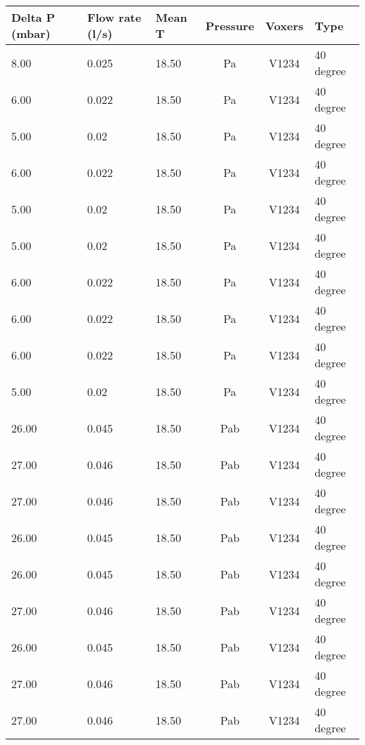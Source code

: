 \begin{table}[t]
\centering
\begin{tabular}{l | l | l | c | c | l}
Delta P (mbar) & Flow rate (l/s) & Mean T & Pressure & Voxers & Type                \\ \hline
8.00           & 0.025           & 18.50  & Pa       & V1234  & 40 degree           \\
6.00           & 0.022           & 18.50  & Pa       & V1234  & 40 degree           \\
5.00           & 0.02            & 18.50  & Pa       & V1234  & 40 degree           \\
6.00           & 0.022           & 18.50  & Pa       & V1234  & 40 degree           \\
5.00           & 0.02            & 18.50  & Pa       & V1234  & 40 degree           \\
5.00           & 0.02            & 18.50  & Pa       & V1234  & 40 degree           \\
6.00           & 0.022           & 18.50  & Pa       & V1234  & 40 degree           \\
6.00           & 0.022           & 18.50  & Pa       & V1234  & 40 degree           \\
6.00           & 0.022           & 18.50  & Pa       & V1234  & 40 degree           \\
5.00           & 0.02            & 18.50  & Pa       & V1234  & 40 degree           \\
26.00          & 0.045           & 18.50  & Pab      & V1234  & 40 degree           \\
27.00          & 0.046           & 18.50  & Pab      & V1234  & 40 degree           \\
27.00          & 0.046           & 18.50  & Pab      & V1234  & 40 degree           \\
26.00          & 0.045           & 18.50  & Pab      & V1234  & 40 degree           \\
26.00          & 0.045           & 18.50  & Pab      & V1234  & 40 degree           \\
27.00          & 0.046           & 18.50  & Pab      & V1234  & 40 degree           \\
26.00          & 0.045           & 18.50  & Pab      & V1234  & 40 degree           \\
27.00          & 0.046           & 18.50  & Pab      & V1234  & 40 degree           \\
27.00          & 0.046           & 18.50  & Pab      & V1234  & 40 degree           \\

\end{tabular}
\end{table}

